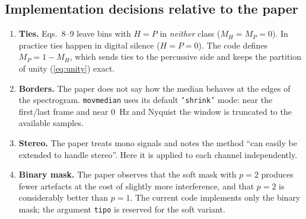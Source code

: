 \documentclass[11pt,a4paper]{article}
\newcommand{\code}[1]{\texttt{#1}}
\begin{document}
\subsection{Implementation decisions relative to the paper}
\begin{enumerate}
  \item \textbf{Ties.} Eqs.~8--9 leave bins with $H=P$ in \emph{neither}
        class ($M_H=M_P=0$). In practice ties happen in digital silence
        ($H=P=0$). The code defines $M_P=1-M_H$, which sends ties to the
        percussive side and keeps the partition of unity
        (\cref{eq:unity}) exact.
  \item \textbf{Borders.} The paper does not say how the median behaves at
        the edges of the spectrogram. \code{movmedian} uses its default
        \code{'shrink'} mode: near the first/last frame and near 0~Hz and
        Nyquist the window is truncated to the available samples.
  \item \textbf{Stereo.} The paper treats mono signals and notes the
        method ``can easily be extended to handle stereo''. Here it is
        applied to each channel independently.
  \item \textbf{Binary mask.} The paper observes that the soft mask with
        $p=2$ produces fewer artefacts at the cost of slightly more
        interference, and that $p=2$ is considerably better than $p=1$.
        The current code implements only the binary mask; the argument
        \code{tipo} is reserved for the soft variant.
\end{enumerate}
\end{document}
